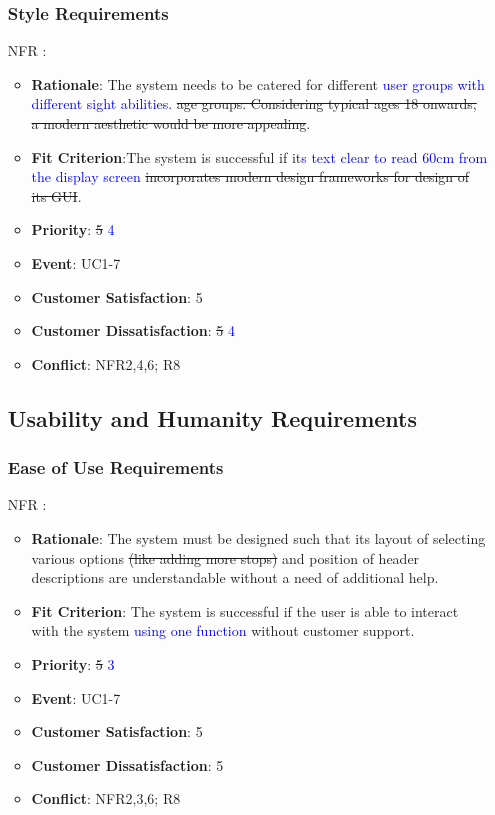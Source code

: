 \documentclass[12pt, titlepage]{article}
\newcounter{reqnum} %
\newcounter{freqnum} %
\begin{document}
\begin{itemize}
\subsubsection{Style Requirements}
\item[NFR\refstepcounter{freqnum}\thefreqnum
\label{NFR}:] 
\begin{itemize}
    \item \textbf{Rationale}: The system needs to be catered for different \textcolor{blue}{user groups with different sight abilities.} \sout{age groups. Considering typical ages 18 onwards, a modern aesthetic would be more appealing}.
    \item \textbf{Fit Criterion}:The system is successful if it\textcolor{blue}{s text clear to read 60cm from the display screen} \sout{incorporates modern design frameworks for design of its GUI}.
    \item \textbf{Priority}: \sout{5} \textcolor{blue}{4}
    \item \textbf{Event}: UC1-7 %
    \item \textbf{Customer Satisfaction}: 5
    \item \textbf{Customer Dissatisfaction}: \sout{5} \textcolor{blue}{4}
    \item \textbf{Conflict}: NFR2,4,6; R8
\end{itemize}
\subsection{Usability and Humanity Requirements}

\subsubsection{Ease of Use Requirements}

\item[NFR\refstepcounter{freqnum}\thefreqnum
\label{NFR}:] 
\begin{itemize}
    \item \textbf{Rationale}: The system must be designed such that its layout of selecting various options \sout{(like adding more stops)} and position of header descriptions are understandable without a need of additional help.
    \item \textbf{Fit Criterion}: The system is successful if the user is able to interact with the system \textcolor{blue}{using one function} without customer support.
    \item \textbf{Priority}: \sout{5} \textcolor{blue}{3}
    \item \textbf{Event}: UC1-7%
    \item \textbf{Customer Satisfaction}: 5
    \item \textbf{Customer Dissatisfaction}: 5
    \item \textbf{Conflict}: NFR2,3,6; R8
\end{itemize}

\end{itemize}
\end{document}
